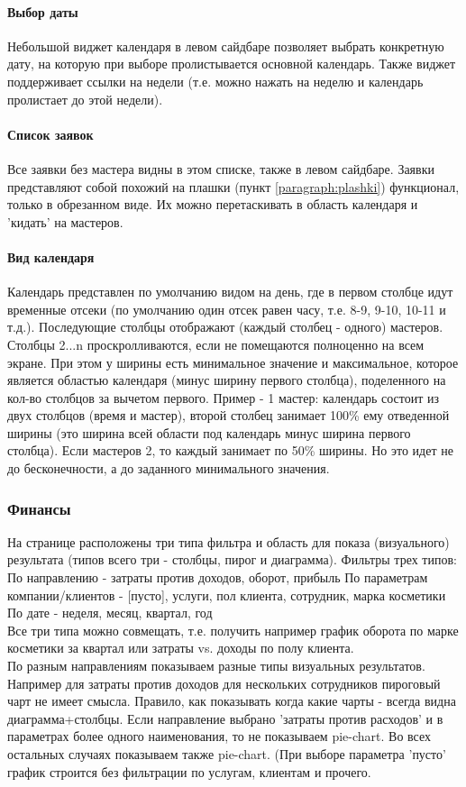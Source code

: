 \documentclass[DIV=calc, paper=a4, fontsize=11pt]{scrartcl} %
\begin{document}
\paragraph{Выбор даты}
Небольшой виджет календаря в левом сайдбаре позволяет выбрать конкретную дату, на которую при выборе пролистывается основной календарь. Также виджет поддерживает ссылки на недели (т.е. можно нажать на неделю и календарь пролистает до этой недели).
\paragraph{Список заявок}
Все заявки без мастера видны в этом списке, также в левом сайдбаре. Заявки представляют собой похожий на плашки (пункт \ref{paragraph:plashki}) функционал, только в обрезанном виде. Их можно перетаскивать в область календаря и 'кидать' на мастеров.
\paragraph{Вид календаря}
Календарь представлен по умолчанию видом на день, где в первом столбце идут временные отсеки (по умолчанию один отсек равен часу, т.е. 8-9, 9-10, 10-11 и т.д.). Последующие столбцы отображают (каждый столбец - одного) мастеров.
\\[0.5cm]
Столбцы 2...n проскролливаются, если не помещаются полноценно на всем экране. При этом у ширины есть минимальное значение и максимальное, которое является областью календаря (минус ширину первого столбца), поделенного на кол-во столбцов за вычетом первого. Пример - 1 мастер: календарь состоит из двух столбцов (время и мастер), второй столбец занимает 100\% ему отведенной ширины (это ширина всей области под календарь минус ширина первого столбца). Если мастеров 2, то каждый занимает по 50\% ширины. Но это идет не до бесконечности, а до заданного минимального значения. 


\subsubsection{Финансы}\label{subsubsec:finance}
На странице расположены три типа фильтра и область для показа (визуального) результата (типов всего три - столбцы, пирог и диаграмма). Фильтры трех типов:
По направлению - затраты против доходов, оборот, прибыль
По параметрам компании/клиентов - [пусто], услуги, пол клиента, сотрудник, марка косметики
По дате - неделя, месяц, квартал, год
\\[0.5cm]
Все три типа можно совмещать, т.е. получить например график оборота по марке косметики за квартал или затраты vs. доходы по полу клиента. 
\\[0.5cm]
По разным направлениям показываем разные типы визуальных результатов. Например для затраты против доходов для нескольких сотрудников пироговый чарт не имеет смысла. Правило, как показывать когда какие чарты - всегда видна диаграмма+столбцы. Если направление выбрано 'затраты против расходов' и в параметрах более одного наименования, то не показываем pie-chart. Во всех остальных случаях показываем также pie-chart. (При выборе параметра 'пусто' график строится без фильтрации по услугам, клиентам и прочего.
\end{document}
